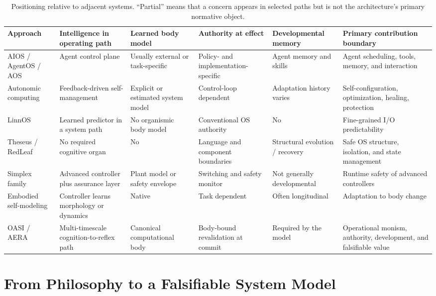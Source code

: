 \documentclass[journal,10pt]{IEEEtran}
\newcommand{\OASI}{\textsc{OASI}}
\newcommand{\AERA}{\textsc{AERA}}
\begin{document}
\begin{table}[t]
\centering
\caption{Positioning relative to adjacent systems. ``Partial'' means that a concern appears in selected paths but is not the architecture's primary normative object.}
\label{tab:positioning}
\small
\begin{tabularx}{\textwidth}{@{}p{2.25cm}p{2.05cm}p{2.05cm}p{2.05cm}p{2.05cm}X@{}}
\toprule
Approach & Intelligence in operating path & Learned body model & Authority at effect & Developmental memory & Primary contribution boundary \\
\midrule
AIOS / AgentOS / AOS & Agent control plane & Usually external or task-specific & Policy- and implementation-specific & Agent memory and skills & Agent scheduling, tools, memory, and interaction \\
Autonomic computing & Feedback-driven self-management & Explicit or estimated system model & Control-loop dependent & Adaptation history varies & Self-configuration, optimization, healing, protection \\
LinnOS & Learned predictor in a system path & No organismic body model & Conventional OS authority & No & Fine-grained I/O predictability \\
Theseus / RedLeaf & No required cognitive organ & No & Language and component boundaries & Structural evolution / recovery & Safe OS structure, isolation, and state management \\
Simplex family & Advanced controller plus assurance layer & Plant model or safety envelope & Switching and safety monitor & Not generally developmental & Runtime safety of advanced controllers \\
Embodied self-modeling & Controller learns morphology or dynamics & Native & Task dependent & Often longitudinal & Adaptation to body change \\
\OASI{} / \AERA{} & Multi-timescale cognition-to-reflex path & Canonical computational body & Body-bound revalidation at commit & Required by the model & Operational monism, authority, development, and falsifiable value \\
\bottomrule
\end{tabularx}
\end{table}

\section{From Philosophy to a Falsifiable System Model}
\end{document}

